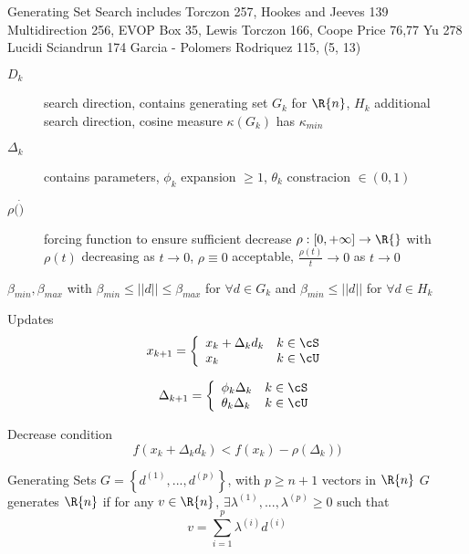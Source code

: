 Generating Set Search
includes Torczon 257, Hookes and Jeeves 139 Multidirection 256, EVOP Box 35, Lewis Torczon 166, Coope Price 76,77 Yu 278 Lucidi Sciandrun 174 Garcia - Polomers Rodriquez 115,     (5, 13)

\begin{description}
\item[$D_k$] search direction, contains generating set $G_k$ for $\R{n}$, $H_k$ additional search direction, 
cosine measure $\kappa (G_k)$ has $\kappa_{min}$
\item[$\Delta_k$] contains parameters, $\phi_k$ expansion $\ge 1$, $\theta_k $ constracion $\in (0,1)$
\item[$\rho ( \dot )$] forcing function to ensure sufficient decrease $\rho : \left[ 0 , + \infty \right] \rightarrow \R{}$ with $\rho(t)$ decreasing as $t \rightarrow 0$, $\rho \equiv 0$ acceptable, $\frac{\rho (t)}{t} \rightarrow 0 $ as $t\rightarrow 0$ 
\end{description}

$\beta_{min}, \beta_{max}$
with $\beta_{min} \le ||d|| \le \beta_{max} $ for $\forall d \in G_k$ and $\beta_{min} \le || d ||$ for $\forall d \in H_k$

Updates
\begin{equation}
x_{k+1} = \left\{  \begin{array}{l l}
						x_k + \Delta_k d_k  	&	k \in \cS \\
						x_k					&	k \in \cU 
					\end{array}
			\right.
\end{equation}


\begin{equation}
\Delta_{k+1} = \left\{  \begin{array}{l l}
						\phi_k \Delta_k  		&	k \in \cS \\
						\theta_k \Delta_k	&	k \in \cU 
					\end{array}
			\right.
\end{equation}

Decrease condition
\begin{equation}
f(x_k  + \Delta_k d_k ) < f(x_k) - \rho ( \Delta_k))
\end{equation}

Generating Sets
$G = \left\{ d^{(1)} , ... , d^{(p)} \right\}$, with $p \ge n+1$ vectors in $\R{n}$
$G$ generates $\R{n}$ if for any $v\in \R{n}$, $\exists \lambda^{(1)}, ..., \lambda^{(p)} \ge 0$ such that
\begin{equation}
v = \sum_{i=1}^p \lambda^{(i)} d^{(i)}
\end{equation}

